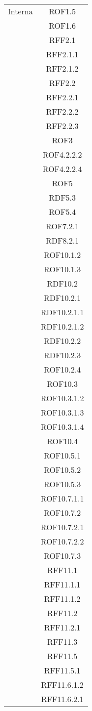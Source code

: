 \begin{longtable}{|c|c|}
\midrule
Interna
& ROF1.5\\
& ROF1.6\\
& RFF2.1\\
& RFF2.1.1\\
& RFF2.1.2\\
& RFF2.2\\
& RFF2.2.1\\
& RFF2.2.2\\
& RFF2.2.3\\
& ROF3\\
& ROF4.2.2.2\\
& ROF4.2.2.4\\
& ROF5\\
& RDF5.3\\
& ROF5.4\\
& ROF7.2.1\\
& RDF8.2.1\\
& ROF10.1.2\\
& ROF10.1.3\\
& RDF10.2\\
& RDF10.2.1\\
& RDF10.2.1.1\\
& RDF10.2.1.2\\
& RDF10.2.2\\
& RDF10.2.3\\
& ROF10.2.4\\
& ROF10.3\\
& ROF10.3.1.2\\
& ROF10.3.1.3\\
& ROF10.3.1.4\\
& ROF10.4\\
& ROF10.5.1\\
& ROF10.5.2\\
& ROF10.5.3\\
& ROF10.7.1.1\\
& ROF10.7.2\\
& ROF10.7.2.1\\
& ROF10.7.2.2\\
& ROF10.7.3\\
& RFF11.1\\
& RFF11.1.1\\
& RFF11.1.2\\
& RFF11.2\\
& RFF11.2.1\\
& RFF11.3\\
& RFF11.5\\
& RFF11.5.1\\
& RFF11.6.1.2\\
& RFF11.6.2.1\\

\end{longtable}
